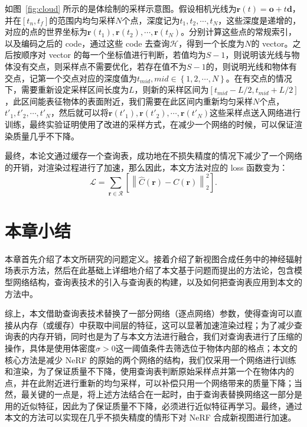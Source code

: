 如图~\ref{fig:cloud} 所示的是体绘制的采样示意图。假设相机光线为$\symbf{r}\left(t\right) = \symbf{o} + t \symbf{d}$，并在$\left[t_n, t_f\right]$的范围内均匀采样$N$个点，深度记为$t_{1}, t_{2}, \cdots, t_{N}$，这些深度是递增的，对应的点的世界坐标为$\symbf{r}\left(t_{1}\right), \symbf{r}\left(t_{2}\right), \cdots, \symbf{r}\left(t_{N}\right)$。分别计算这些点的常规索引，以及编码之后的 code，通过这些 code 去查询$\mathcal{H}$，得到一个长度为$N$的 vector。之后按顺序对 vector 的每一个坐标值进行判断，若值均为$S - 1$，则说明该光线与物体没有交点，则采样点不需要优化，若存在值不为$S - 1$的，则说明光线和物体有交点，记第一个交点对应的深度值为$t_{mid}, mid \in \left\{1, 2, \cdots, N\right\}$。在有交点的情况下，需要重新设定采样区间长度为$L$，则新的采样区间为$\left[t_{mid} - L / 2, t_{mid} + L / 2\right]$，此区间能表征物体的表面附近，我们需要在此区间内重新均匀采样$N$个点，${t\prime}_{1}, {t\prime}_{2}, \cdots, {t\prime}_{N}$，然后就可以将$\symbf{r}\left(t\prime_{1}\right), \symbf{r}\left(t\prime_{2}\right), \cdots, \symbf{r}\left(t\prime_{N}\right)$这些采样点送入网络进行训练，最终实验证明使用了改进的采样方式，在减少一个网络的时候，可以保证渲染质量几乎不下降。

最终，本论文通过缓存一个查询表，成功地在不损失精度的情况下减少了一个网络的开销，对渲染过程进行了加速，那么因此，本文方法对应的 loss 函数变为：
\begin{equation}
    \mathcal{L} = \sum_{\symbf{r}\in \mathcal{R}}\left[\left\|\hat{C}\left(\symbf{r}\right) - C\left(\symbf{r}\right)\right\|_{2}^{2} \right].
    \label{eq:fnerf_loss}
\end{equation}

\section{本章小结}
本章首先介绍了本文所研究的问题定义。接着介绍了新视图合成任务中的神经辐射场表示方法，然后在此基础上详细地介绍了本文基于问题而提出的方法论，包含模型网络结构，查询表技术的引入与查询表的构建，以及如何把查询表应用到本文的方法中。

综上，本文借助查询表技术替换了一部分网络（逐点网络）参数，使得查询可以直接从内存（或缓存）中获取中间层的特征，这可以显著加速渲染过程；为了减少查询表的内存开销，同时也是为了与本文方法进行融合，我们对查询表进行了压缩的操作，具体是使用体密度$\sigma > 0$这一阈值条件去筛选位于物体内部的格点；本文的核心方法是减少 NeRF 的原始的两个网络的结构，我们仅采用一个网络进行训练和渲染，为了保证质量不下降，使用查询表判断原始采样点并第一个在物体内的点，并在此附近进行重新的均匀采样，可以补偿只用一个网络带来的质量下降；当然，最关键的一点是，将上述方法结合在一起时，由于查询表替换网络这一部分是用的近似特征，因此为了保证质量不下降，必须进行近似特征再学习。最终，通过本文的方法可以实现在几乎不损失精度的情形下对 NeRF 合成新视图进行加速。

\cleardoublepage

